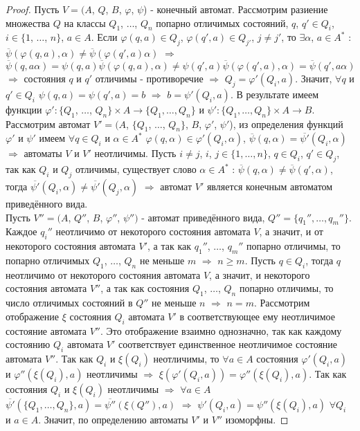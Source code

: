 \documentclass[a4paper, 12pt]{article}
\renewcommand{\phi}{\varphi}
\theoremstyle{definition}
\theoremstyle{plain}
\theoremstyle{remark}
\begin{document}
  \begin{proof}
    Пусть $V=(A$, $Q$, $B$, $\phi$, $\psi$) - конечный автомат. Рассмотрим разиение множества $Q$ на классы $Q_1$, $\ldots$, $Q_n$ попарно отличимых состояний, $q$, $q'\in Q_i$, $i\in\{1$, $\ldots$, $n\}$, $a\in A$. Если $\phi(q,a)\in Q_j$, $\phi(q',a)\in Q_{j'}$, $j\neq j'$, то $\exists \alpha$, $a\in A^*$ : $\overline{\psi}(\phi(q,a),\alpha)\neq\overline{\psi}(\phi(q',a)\alpha)$ $\Longrightarrow$ $\overline{\psi}(q,a\alpha)=\psi(q,a)\overline{\psi}(\phi(q,a),\alpha)\neq\psi(q',a)\overline{\psi}(\phi(q',a),\alpha)=\overline{\psi}(q',a\alpha)$ $\Longrightarrow$ состояния $q$ и $q'$ отличимы - противоречие $\Longrightarrow$ $Q_{j}=\phi'(Q_i,a)$. Значит, $\forall q$ и $q'\in Q_i$ $\psi(q,a)=\psi(q',a)=b$ $\Longrightarrow$ $b=\psi'(Q_i,a)$. В результате имеем функции $\phi':\{Q_1$, $\ldots$, $Q_n\}\times A\rightarrow \{Q_1,\ldots, Q_n\}$ и $\psi':\{Q_1,\ldots, Q_n\}\times A\rightarrow B$. Рассмотрим автомат $V'=(A$, $\{Q_1$, $\ldots$, $Q_n\}$, $B$, $\phi'$, $\psi'$), из определения функций $\phi'$ и $\psi'$ имеем $\forall q\in Q_i$ и $\alpha\in A^*$ $\phi(q,\alpha)\in \phi'(Q_i, \alpha)$, $\overline{\psi}(q,\alpha)=\overline{\psi'}(Q_i,\alpha)$ $\Longrightarrow$ автоматы $V$ и $V'$ неотличимы. Пусть $i\neq j$, $i$, $j\in\{1,\ldots, n\}$, $q\in Q_i$, $q'\in Q_j$, так как $Q_i$ и $Q_j$ отличимы, существует слово $\alpha\in A^*$ : $\overline{\psi}(q,\alpha)\neq\overline{\psi}(q',\alpha)$, тогда $\overline{\psi'}(Q_i, \alpha)\neq\overline{\psi'}(Q_j,\alpha)$ $\Longrightarrow$ автомат $V'$ является конечным автоматом приведённого вида.\\
    Пусть $V''=(A$, $Q''$, $B$, $\phi''$, $\psi'')$ - автомат приведённого вида, $Q''=\{q_1'',\ldots, q_m''\}$. Каждое $q_i''$ неотличимо от некоторого состояния автомата $V$, а значит, и от некоторого состояния автомата $V'$, а так как $q_1''$, $\ldots$, $q_m''$ попарно отличимы, то попарно отличимых $Q_1$, $\ldots$, $Q_n$ не меньше $m$ $\Longrightarrow$ $n\geqslant m$. Пусть $q\in Q_i$, тогда $q$ неотличимо от некоторого состояния автомата $V$, а значит, и некоторого состояния автомата $V''$, а так как состояния $Q_1$, $\ldots$, $Q_n$ попарно отличимы, то число отличимых состояний в $Q''$ не меньше $n$ $\Longrightarrow$ $n=m$. Рассмотрим отображение $\xi$ состояния $Q_i$ автомата $V'$ в соответствующее ему неотличимое состояние автомата $V''$. Это отображение взаимно однозначно, так как каждому состоянию $Q_i$ автомата $V'$ соответствует единственное неотличимое состояние автомата $V''$. Так как $Q_i$ и $\xi(Q_i)$ неотличимы, то $\forall a\in A$ состояния $\phi'(Q_i,a)$ и $\phi''(\xi(Q_i),a)$ неотличимы $\Longrightarrow$ $\xi(\phi'(Q_i,a))=\phi''(\xi(Q_i),a)$. Так как состояния $Q_i$ и $\xi(Q_i)$ неотличимы $\Longrightarrow$ $\forall a\in A$ $\overline{\psi'}(\{Q_1,\ldots,Q_n\},a)=\overline{\psi''}(\xi(Q''),a)$ $\Longrightarrow$ $\psi'(Q_i,a)=\psi''(\xi(Q_i),a)$ $\forall Q_i$ и $a\in A$. Значит, по определению автоматы $V'$ и $V''$ изоморфны.
  \end{proof}
\end{document}
